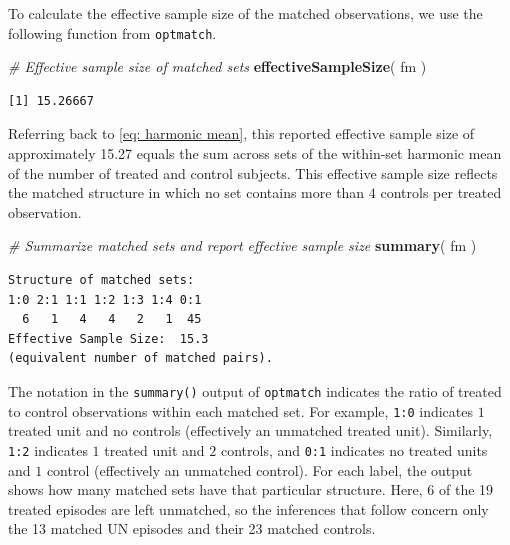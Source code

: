 \documentclass[
  12pt,
  leqno]{article}
\newenvironment{Shaded}{\begin{snugshade}}{\end{snugshade}}
\newcommand{\CommentTok}[1]{\textcolor[rgb]{0.56,0.35,0.01}{\textit{#1}}}
\newcommand{\FunctionTok}[1]{\textcolor[rgb]{0.13,0.29,0.53}{\textbf{#1}}}
\newcommand{\NormalTok}[1]{#1}
\begin{document}
\doublespacing

To calculate the effective sample size of the matched observations, we
use the following function from \texttt{optmatch}.

\singlespacing

\begin{Shaded}
\begin{Highlighting}[]
\CommentTok{\# Effective sample size of matched sets}
\FunctionTok{effectiveSampleSize}\NormalTok{(}
\NormalTok{  fm}
\NormalTok{)}
\end{Highlighting}
\end{Shaded}

\begin{verbatim}
[1] 15.26667
\end{verbatim}

\doublespacing

Referring back to \eqref{eq: harmonic mean}, this reported effective
sample size of approximately 15.27 equals the sum across sets of the
within-set harmonic mean of the number of treated and control subjects.
This effective sample size reflects the matched structure in which no
set contains more than \(4\) controls per treated observation.

\singlespacing

\begin{Shaded}
\begin{Highlighting}[]
\CommentTok{\# Summarize matched sets and report effective sample size}
\FunctionTok{summary}\NormalTok{(}
\NormalTok{  fm}
\NormalTok{)}
\end{Highlighting}
\end{Shaded}

\begin{verbatim}
Structure of matched sets:
1:0 2:1 1:1 1:2 1:3 1:4 0:1 
  6   1   4   4   2   1  45 
Effective Sample Size:  15.3 
(equivalent number of matched pairs).
\end{verbatim}

\doublespacing

The notation in the \texttt{summary()} output of \texttt{optmatch}
indicates the ratio of treated to control observations within each
matched set. For example, \texttt{1:0} indicates \(1\) treated unit and
no controls (effectively an unmatched treated unit). Similarly,
\texttt{1:2} indicates \(1\) treated unit and \(2\) controls, and
\texttt{0:1} indicates no treated units and \(1\) control (effectively
an unmatched control). For each label, the output shows how many matched
sets have that particular structure. Here, 6 of the 19 treated episodes
are left unmatched, so the inferences that follow concern only the 13
matched UN episodes and their 23 matched controls.
\end{document}
